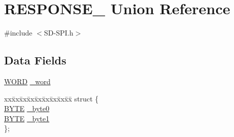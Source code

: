 \hypertarget{union_r_e_s_p_o_n_s_e__2}{}\section{R\+E\+S\+P\+O\+N\+S\+E\+\_ Union Reference}
\label{union_r_e_s_p_o_n_s_e__2}


{\ttfamily \#include $<$S\+D-\/\+S\+P\+I.\+h$>$}

\subsection*{Data Fields}
\begin{DoxyCompactItemize}
\item 
\hyperlink{_generic_type_defs_8h_a2b0e863dadf920709ec53d9088ee7c91}{W\+O\+R\+D} \hyperlink{union_r_e_s_p_o_n_s_e__2_a6a5f159fcaca96aba991cf7298cc1083}{\+\_\+word}
\item 
\begin{tabbing}
xx\=xx\=xx\=xx\=xx\=xx\=xx\=xx\=xx\=\kill
struct \{\\
\>\hyperlink{_generic_type_defs_8h_a4ae1dab0fb4b072a66584546209e7d58}{BYTE} \hyperlink{union_r_e_s_p_o_n_s_e__2_a93716eb22819e26ee62f5d28d97adb9f}{\_byte0}\\
\>\hyperlink{_generic_type_defs_8h_a4ae1dab0fb4b072a66584546209e7d58}{BYTE} \hyperlink{union_r_e_s_p_o_n_s_e__2_a7d5f3b40b15af6ed45be5faa5100147c}{\_byte1}\\
\}; \\


\end{tabbing}
\end{DoxyCompactItemize}
